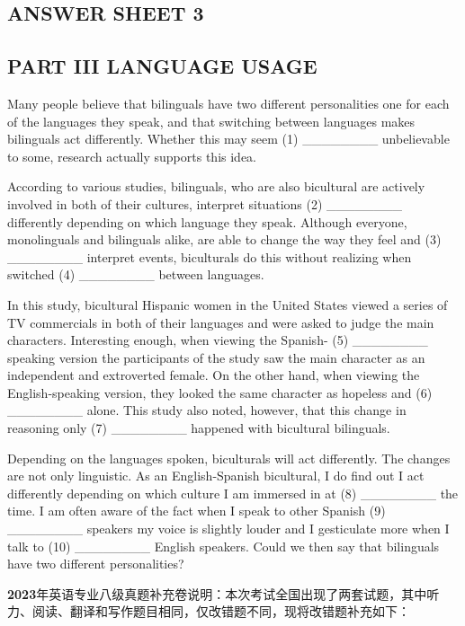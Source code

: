 \documentclass[UTF8,11pt]{ctexart}
\begin{document}
\subsection*{\textbf{ANSWER SHEET 3}}


\subsection*{\textbf{PART III LANGUAGE USAGE}}


Many people believe that bilinguals have two different personalities one for each of the languages they speak, and that switching between languages makes bilinguals act differently. Whether this may seem (1) \_\_\_\_\_\_\_\_ unbelievable to some, research actually supports this idea.


According to various studies, bilinguals, who are also bicultural are actively involved in both of their cultures, interpret situations (2) \_\_\_\_\_\_\_\_ differently depending on which language they speak. Although everyone, monolinguals and bilinguals alike, are able to change the way they feel and (3) \_\_\_\_\_\_\_\_ interpret events, biculturals do this without realizing when switched (4) \_\_\_\_\_\_\_\_ between languages.


In this study, bicultural Hispanic women in the United States viewed a series of TV commercials in both of their languages and were asked to judge the main characters. Interesting enough, when viewing the Spanish- (5) \_\_\_\_\_\_\_\_ speaking version the participants of the study saw the main character as an independent and extroverted female. On the other hand, when viewing the English-speaking version, they looked the same character as hopeless and (6) \_\_\_\_\_\_\_\_ alone. This study also noted, however, that this change in reasoning only (7) \_\_\_\_\_\_\_\_ happened with bicultural bilinguals.


Depending on the languages spoken, biculturals will act differently. The changes are not only linguistic. As an English-Spanish bicultural, I do find out I act differently depending on which culture I am immersed in at (8) \_\_\_\_\_\_\_\_ the time. I am often aware of the fact when I speak to other Spanish (9) \_\_\_\_\_\_\_\_ speakers my voice is slightly louder and I gesticulate more when I talk to (10) \_\_\_\_\_\_\_\_ English speakers. Could we then say that bilinguals have two different personalities?


\textbf{2023}年英语专业八级真题补充卷说明：本次考试全国出现了两套试题，其中听力、阅读、翻译和写作题目相同，仅改错题不同，现将改错题补充如下：
\end{document}
